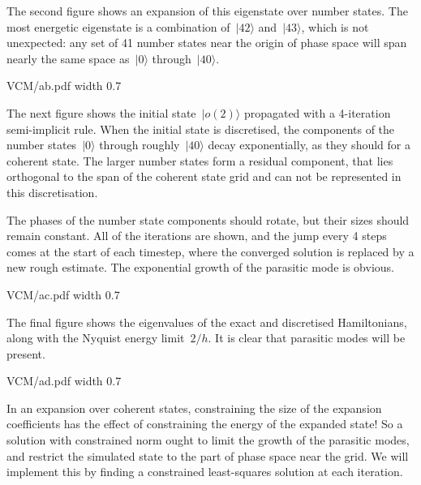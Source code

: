 The second figure shows an expansion of this eigenstate over number states.  The most energetic eigenstate is a combination of~$|42〉$ and~$|43〉$, which is not unexpected: any set of 41 number states near the origin of phase space will span nearly the same space as~$|0〉$ through~$|40〉$.

\XeTeXpdffile VCM/ab.pdf width 0.7\hsize

The next figure shows the initial state~$|o(2)〉$ propagated with a 4-iteration semi-implicit rule.  When the initial state is discretised, the components of the number states~$|0〉$ through roughly~$|40〉$ decay exponentially, as they should for a coherent state.  The larger number states form a residual component, that lies orthogonal to the span of the coherent state grid and can not be represented in this discretisation.

The phases of the number state components should rotate, but their sizes should remain constant.  All of the iterations are shown, and the jump every 4 steps comes at the start of each timestep, where the converged solution is replaced by a new rough estimate.  The exponential growth of the parasitic mode is obvious.

\XeTeXpdffile VCM/ac.pdf width 0.7\hsize

The final figure shows the eigenvalues of the exact and discretised Hamiltonians, along with the Nyquist energy limit~$2/h$.  It is clear that parasitic modes will be present.

\XeTeXpdffile VCM/ad.pdf width 0.7\hsize

In an expansion over coherent states, constraining the size of the expansion coefficients has the effect of constraining the energy of the expanded state!  So a solution with constrained norm ought to limit the growth of the parasitic modes, and restrict the simulated state to the part of phase space near the grid.  We will implement this by finding a constrained least-squares solution at each iteration. 

\bye